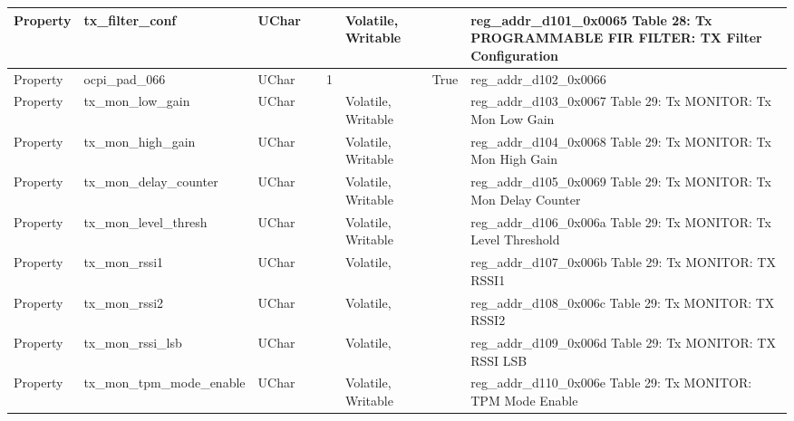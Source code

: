 \documentclass{article}
\begin{document}
\begin{scriptsize}
\begin{longtable}{|p{2cm}|p{5cm}|p{1cm}|p{2cm}|p{2cm}|p{1.75cm}|p{1.5cm}|p{5.1cm}|}
  \hline
  Property & tx\_filter\_conf                                         & UChar &                  &                  & Volatile,  Writable &         & reg\_addr\_d101\_0x0065 Table 28: Tx PROGRAMMABLE FIR FILTER: TX Filter Configuration \\
  \hline
  Property & ocpi\_pad\_066                                           & UChar &                  & 1                &                     & True    & reg\_addr\_d102\_0x0066 \\
  \hline
  Property & tx\_mon\_low\_gain                                       & UChar &                  &                  & Volatile,  Writable &         & reg\_addr\_d103\_0x0067 Table 29: Tx MONITOR: Tx Mon Low Gain \\
  \hline
  Property & tx\_mon\_high\_gain                                      & UChar &                  &                  & Volatile,  Writable &         & reg\_addr\_d104\_0x0068 Table 29: Tx MONITOR: Tx Mon High Gain \\
  \hline
  Property & tx\_mon\_delay\_counter                                  & UChar &                  &                  & Volatile,  Writable &         & reg\_addr\_d105\_0x0069 Table 29: Tx MONITOR: Tx Mon Delay Counter \\
  \hline
  Property & tx\_mon\_level\_thresh                                   & UChar &                  &                  & Volatile,  Writable &         & reg\_addr\_d106\_0x006a Table 29: Tx MONITOR: Tx Level Threshold \\
  \hline
  Property & tx\_mon\_rssi1                                           & UChar &                  &                  & Volatile,           &         & reg\_addr\_d107\_0x006b Table 29: Tx MONITOR: TX RSSI1 \\
  \hline
  Property & tx\_mon\_rssi2                                           & UChar &                  &                  & Volatile,           &         & reg\_addr\_d108\_0x006c Table 29: Tx MONITOR: TX RSSI2 \\
  \hline
  Property & tx\_mon\_rssi\_lsb                                       & UChar &                  &                  & Volatile,           &         & reg\_addr\_d109\_0x006d Table 29: Tx MONITOR: TX RSSI LSB \\
  \hline
  Property & tx\_mon\_tpm\_mode\_enable                               & UChar &                  &                  & Volatile,  Writable &         & reg\_addr\_d110\_0x006e Table 29: Tx MONITOR: TPM Mode Enable \\

\end{longtable}
\end{scriptsize}
\end{document}
